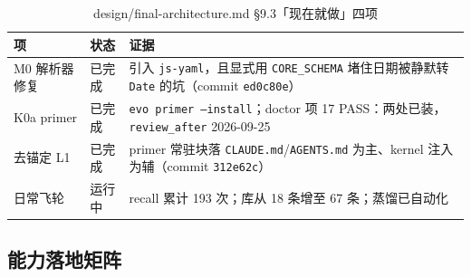 \documentclass[12pt,a4paper]{ctexart}
\begin{document}
\begin{table}[H]
\centering
\caption{design/final-architecture.md §9.3「现在就做」四项}
\begin{tabular}{@{}lp{5.5cm}p{4.2cm}@{}}
\toprule
\textbf{项} & \textbf{状态} & \textbf{证据} \\
\midrule
M0 解析器修复 & \textcolor{evogreen}{已完成} & 引入 \texttt{js-yaml}，且显式用 \texttt{CORE\_SCHEMA} 堵住日期被静默转 \texttt{Date} 的坑（commit \texttt{ed0c80e}） \\
K0a primer & \textcolor{evogreen}{已完成} & \texttt{evo primer --install}；doctor 项 17 PASS：两处已装，\texttt{review\_after} 2026-09-25 \\
去锚定 L1 & \textcolor{evogreen}{已完成} & primer 常驻块落 \texttt{CLAUDE.md}/\texttt{AGENTS.md} 为主、kernel 注入为辅（commit \texttt{312e62c}） \\
日常飞轮 & \textcolor{evogreen}{运行中} & recall 累计 193 次；库从 18 条增至 67 条；蒸馏已自动化 \\
\bottomrule
\end{tabular}
\end{table}

\subsection{能力落地矩阵}
\end{document}
